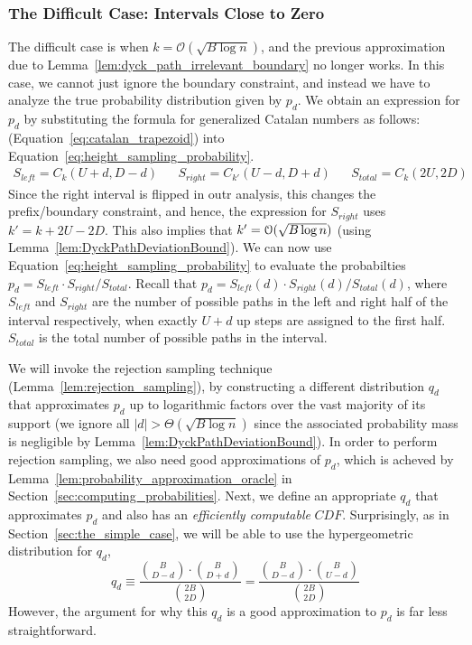 \subsubsection{The Difficult Case: Intervals Close to Zero}
\label{sec:the_difficult_case}
The difficult case is when $k = \mathcal{O}(\sqrt{B\log n})$,
and the previous approximation due to Lemma~\ref{lem:dyck_path_irrelevant_boundary} no longer works.
In this case, we cannot just ignore the boundary constraint, and instead we have to analyze the true probability distribution given by $p_d$.
We obtain an expression for $p_d$ by substituting the formula for generalized Catalan numbers as follows:
(Equation~\ref{eq:catalan_trapezoid}) into Equation~\ref{eq:height_sampling_probability}.
\begin{align}
    S_{left} = C_k(U+d,D-d)
    &&S_{right} = C_{k'}(U-d,D+d)
    &&S_{total} = C_k(2U,2D)
\end{align}
Since the right interval is flipped in outr analysis, this changes the prefix/boundary constraint,
and hence, the expression for $S_{right}$ uses $k' = k+2U-2D$.
This also implies that $k' = \Bo(\sqrt{B\log n})$ (using Lemma~\ref{lem:DyckPathDeviationBound}).
We can now use Equation~\ref{eq:height_sampling_probability} to evaluate the probabilties $p_d = S_{left}\cdot S_{right}/S_{total}$.
Recall that $p_d = S_{left}(d)\cdot S_{right}(d)/S_{total}(d)$, where $S_{left}$ and $S_{right}$ are the number of possible paths
in the left and right half of the interval respectively, when exactly $U+d$ up steps are assigned to the first half.
$S_{total}$ is the total number of possible paths in the interval.

We will invoke the rejection sampling technique (Lemma~\ref{lem:rejection_sampling}), by constructing a different distribution $q_d$
that approximates $p_d$ up to logarithmic factors over the vast majority of its support
(we ignore all $|d|>\Theta(\sqrt{B\log n})$ since the associated probability mass is negligible by Lemma~\ref{lem:DyckPathDeviationBound}).
In order to perform rejection sampling, we also need good approximations of $p_d$,
which is acheved by Lemma~\ref{lem:probability_approximation_oracle} in Section~\ref{sec:computing_probabilities}.
Next, we define an appropriate $q_d$ that approximates $p_d$ and also has an \emph{efficiently computable} $CDF$.
Surprisingly, as in Section~\ref{sec:the_simple_case}, we will be able to use the hypergeometric distribution for $q_d$,
\[
q_d \equiv \frac{{B\choose D-d}\cdot{B\choose D+d}}{{2B\choose 2D}} = \frac{{B\choose D-d}\cdot{B\choose U-d}}{{2B\choose 2D}}
\]
However, the argument for why this $q_d$ is a good approximation to $p_d$ is far less straightforward.

